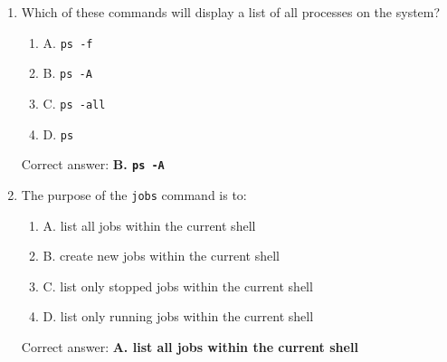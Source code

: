 \documentclass{article}
\begin{document}
\begin{enumerate}
  \item Which of these commands will display a list of all processes on the system?
  \begin{enumerate}
    \item A. \texttt{ps -f}
    \item B. \texttt{ps -A}
    \item C. \texttt{ps -all}
    \item D. \texttt{ps}
  \end{enumerate}
  Correct answer: \textbf{B. \texttt{ps -A}}
  
  \item The purpose of the \texttt{jobs} command is to:
  \begin{enumerate}
    \item A. list all jobs within the current shell
    \item B. create new jobs within the current shell
    \item C. list only stopped jobs within the current shell
    \item D. list only running jobs within the current shell
  \end{enumerate}
  Correct answer: \textbf{A. list all jobs within the current shell}
  
\end{enumerate}
\end{document}
